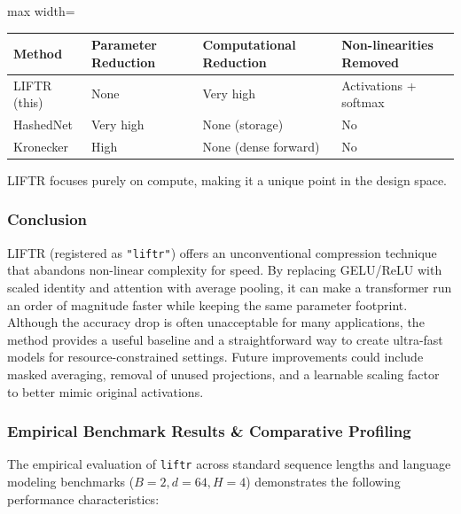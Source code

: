 \begin{center}
\begin{adjustbox}{max width=\columnwidth}
\renewcommand{\arraystretch}{1.2}
\begin{tabular}{llll}
\toprule
Method & Parameter Reduction & Computational Reduction & Non-linearities Removed \\
\midrule
LIFTR (this) & None & Very high & Activations + softmax \\
HashedNet & Very high & None (storage) & No \\
Kronecker & High & None (dense forward) & No \\

\bottomrule
\end{tabular}
\end{adjustbox}
\end{center}
LIFTR focuses purely on compute, making it a unique point in the design space.


\subsubsection*{Conclusion}

LIFTR (registered as \texttt{"liftr"}) offers an unconventional compression technique that abandons non-linear complexity for speed. By replacing GELU/ReLU with scaled identity and attention with average pooling, it can make a transformer run an order of magnitude faster while keeping the same parameter footprint. Although the accuracy drop is often unacceptable for many applications, the method provides a useful baseline and a straightforward way to create ultra-fast models for resource-constrained settings. Future improvements could include masked averaging, removal of unused projections, and a learnable scaling factor to better mimic original activations.

\subsubsection*{Empirical Benchmark Results \& Comparative Profiling}

The empirical evaluation of \texttt{liftr} across standard sequence lengths and language modeling benchmarks ($B=2, d=64, H=4$) demonstrates the following performance characteristics:

